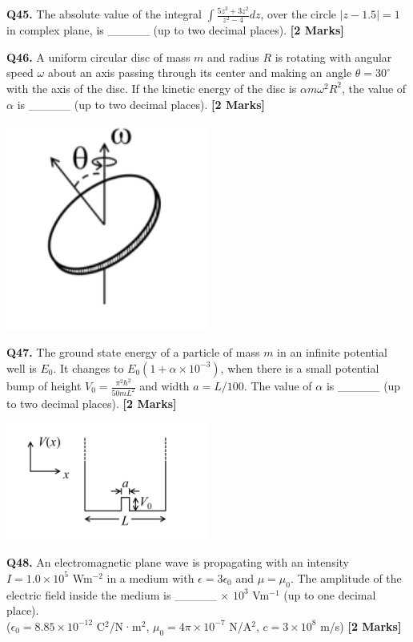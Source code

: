 \documentclass[11pt]{article}
\newcommand{\questionb}[2]{
    \noindent\textbf{Q#2.} #1 \hfill \textbf{[2 Marks]}
}
\begin{document}
\questionb{The absolute value of the integral \(\int \frac{5z^3 + 3z^2}{z^2 - 4} dz\), over the circle \(|z - 1.5| = 1\) in complex plane, is \_\_\_\_\_ (up to two decimal places).}{45}
\vspace{0.5cm}

\questionb{A uniform circular disc of mass \(m\) and radius \(R\) is rotating with angular speed \(\omega\) about an axis passing through its center and making an angle \(\theta = 30^\circ\) with the axis of the disc. If the kinetic energy of the disc is \(\alpha m \omega^2 R^2\), the value of \(\alpha\) is \_\_\_\_\_ (up to two decimal places).}{46}
\begin{center}
\includegraphics[width=0.5\textwidth]{figures/46.png}
\end{center}
\vspace{0.5cm}

\questionb{The ground state energy of a particle of mass \(m\) in an infinite potential well is \(E_0\). It changes to \(E_0(1 + \alpha \times 10^{-3})\), when there is a small potential bump of height \(V_0 = \frac{\pi^2 \hbar^2}{50mL^2}\) and width \(a = L/100\). The value of \(\alpha\) is \_\_\_\_\_ (up to two decimal places).}{47}
\begin{center}
\includegraphics[width=0.5\textwidth]{figures/47.png}
\end{center}
\vspace{0.5cm}

\questionb{An electromagnetic plane wave is propagating with an intensity \(I = 1.0 \times 10^5\) Wm\(^{-2}\) in a medium with \(\epsilon = 3\epsilon_0\) and \(\mu = \mu_0\). The amplitude of the electric field inside the medium is \_\_\_\_\_ × \(10^3\) Vm\(^{-1}\) (up to one decimal place). \\
(\(\epsilon_0 = 8.85 \times 10^{-12}\) C\(^2\)/N·m\(^2\), \(\mu_0 = 4\pi \times 10^{-7}\) N/A\(^2\), \(c = 3 \times 10^8\) m/s)}{48}
\vspace{0.5cm}
\end{document}
